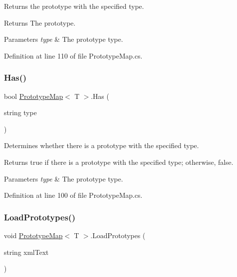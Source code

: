 Returns the prototype with the specified type. 

\begin{DoxyReturn}{Returns}
The prototype.
\end{DoxyReturn}

\begin{DoxyParams}{Parameters}
{\em type} & The prototype type.\\
\hline
\end{DoxyParams}


Definition at line 110 of file Prototype\+Map.\+cs.

\mbox{\label{class_prototype_map_af56d8b380f8f0375eef1e4de0e25283b}} 
\subsubsection{\texorpdfstring{Has()}{Has()}}
{\footnotesize\ttfamily bool \hyperlink{class_prototype_map}{Prototype\+Map}$<$ T $>$.Has (\begin{DoxyParamCaption}\item[{string}]{type }\end{DoxyParamCaption})}



Determines whether there is a prototype with the specified type. 

\begin{DoxyReturn}{Returns}
{\ttfamily true} if there is a prototype with the specified type; otherwise, {\ttfamily false}.
\end{DoxyReturn}

\begin{DoxyParams}{Parameters}
{\em type} & The prototype type.\\
\hline
\end{DoxyParams}


Definition at line 100 of file Prototype\+Map.\+cs.

\mbox{\label{class_prototype_map_af821190bc6abb8405e6c3e94a7d929b1}} 
\subsubsection{\texorpdfstring{Load\+Prototypes()}{LoadPrototypes()}}
{\footnotesize\ttfamily void \hyperlink{class_prototype_map}{Prototype\+Map}$<$ T $>$.Load\+Prototypes (\begin{DoxyParamCaption}\item[{string}]{xml\+Text }\end{DoxyParamCaption})}



